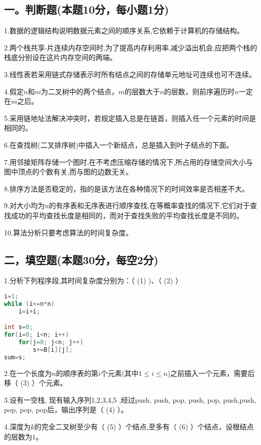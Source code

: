 
\subsection{一。判断题(本题10分，每小题1分)}

1.数据的逻辑结构说明数据元素之间的顺序关系,它依赖于计算机的存储结构。

2.两个栈共享-片连续内存空间时,为了提高内存利用率,减少溢出机会,应把两个栈的栈底分别设在这片内存空间的两端。

3.线性表若采用链式存储表示时所有结点之间的存储单元地址可连续也可不连续。

4.假定$n$和$m$为二叉树中的两个结点，$m$的层数大于$n$的层数，则前序遍历时$n$一定在$m$之后。

5.采用链地址法解决冲突时，若规定插入总是在链首，则插入任一个元素的时间是相同的。

6.在查找树(二叉排序树)中插入一个新结点，总是插入到叶子结点的下面。

7.用邻接矩阵存储一个图时,在不考虑压缩存储的情况下,所占用的存储空间大小与图中顶点的个数有关,而与图的边数无关。

8.排序方法是否稳定的，指的是该方法在各种情况下的时间效率是否相差不大。

9.对大小均为$n$的有序表和无序表进行顺序查找,在等概率查找的情况下,它们对于查找成功的平均查找长度是相同的，而对于查找失败的平均查找长度是不同的。

10.算法分析只要考虑算法的时间复杂度。

\subsection{二，填空题(本题30分，每空2分)}

1.分析下列程序段,其时间复杂度分别为：（ (1) )、（ (2) ）
\begin{lstlisting}[language=cpp]
i=1;
while (i<=n*n)
    i=i+i;

int s=0;
for(i=0; i<n; i++)
    for(j=0; j<n; j++)
        s+=B[i][j];
sum=s;
\end{lstlisting}

2.在一个长度为$n$的顺序表的第$i$个元素(其中$1\leqslant i\leqslant n$)之前插入一个元素，需要后移（ (3) ）个元素。

3.设有一空栈, 现有输入序列1,2,3,4,5 ,经过push, push, pop, push, pop, push,push, pop, pop, pop后，输出序列是（ (4) ）。

4.深度为$k$的完全二叉树至少有（ (5) ）个结点,至多有（ (6) ）个结点，设根结点的层数为$1$。

